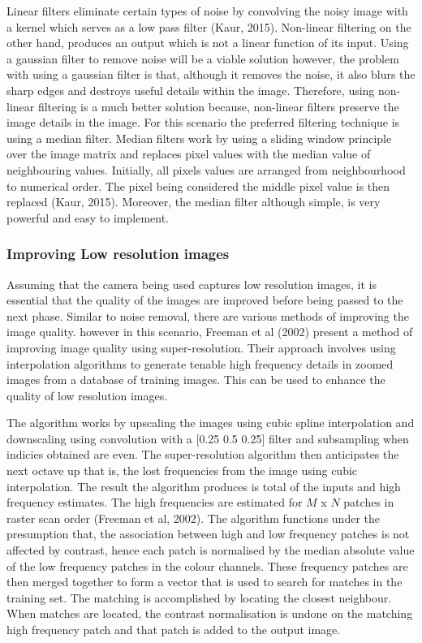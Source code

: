 \documentclass[a4paper, 12pt]{article}
\begin{document}
Linear filters eliminate certain types of noise by convolving the noisy image with a kernel which serves as a low pass filter (Kaur, 2015). Non-linear filtering on the other hand, produces an output which is not a linear function of its input. Using a gaussian filter to remove noise will be a viable solution however, the problem with using a gaussian filter is that, although it removes the noise, it also blurs the sharp edges and destroys useful details within the image. Therefore, using non-linear filtering is a much better solution because, non-linear filters preserve the image details in the image. For this scenario the preferred filtering technique is using a median filter. Median filters work by using a sliding window principle over the image matrix and replaces pixel values with the median value of neighbouring values. Initially, all pixels values are arranged from neighbourhood to numerical order. The pixel being considered the middle pixel value is then replaced (Kaur, 2015). Moreover, the median filter although simple, is very powerful and easy to implement. 

\subsubsection{Improving Low resolution images}

Assuming that the camera being used captures low resolution images, it is essential that the quality of the images are improved before being passed to the next phase. Similar to noise removal, there are various methods of improving the image quality. however in this scenario, Freeman et al (2002) present a method of improving image quality using super-resolution. Their approach involves using interpolation algorithms to generate tenable high frequency details in zoomed images from a database of training images. This can be used to enhance the quality of low resolution images. 
\parskip 0.2in

The algorithm works by upscaling the images using cubic spline interpolation and downscaling using convolution with a [0.25 0.5 0.25] filter and subsampling
when indicies obtained are even. The super-resolution algorithm then anticipates the next octave up that is, the lost frequencies from the image using cubic interpolation. The result the algorithm produces is total of the inputs and high frequency estimates. The high frequencies are estimated for $M$ x $N$ patches in raster scan order (Freeman et al, 2002). The algorithm functions under the presumption that, the association between high and low frequency patches is not affected by contrast, hence each patch is normalised by the median absolute value of the low frequency patches in the colour channels. These frequency patches are then merged together to form a vector that is used to search for matches in the training set. The matching is accomplished by locating the closest neighbour. When matches are located, the contrast normalisation is undone on the matching high frequency patch and that patch is added to the output image.  
\end{document}
